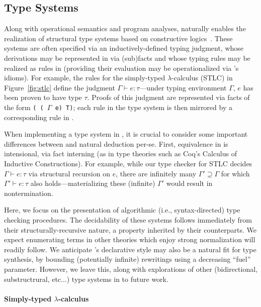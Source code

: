 \subsection{Type Systems}
\label{sec:apps:ts}

Along with operational semantics and program analyses, \slog{}
naturally enables the realization of structural type systems based on
constructive logics~\cite{tapl,atapl}.  These systems are often
specified via an inductively-defined typing judgment, whose
derivations may be represented in \slog{} via (sub)facts and whose
typing rules may be realized as rules in \slog{} (providing their
evaluation may be operationalized via \slog{}'s idioms). For example,
the rules for the simply-typed $\lambda$-calculus (STLC) in
Figure~\ref{fig:stlc} define the judgment $\Gamma \vdash e
:\tau$---under typing environment $\Gamma$, $e$ has been proven to
have type $\tau$. Proofs of this judgment are represented via \slog{}
facts of the form \texttt{(\rtag{:} ( $\Gamma$ e) T)}; each
rule in the type system is then mirrored by a corresponding rule in
\slog{}.

When implementing a type system in \slog{}, it is crucial to consider
some important differences between \slog{} and natural deduction
per-se. First, equivalence in \slog{} is intensional, via fact
interning (as in type theories such as Coq's Calculus of Inductive
Constructions). For example, while our type checker for STLC decides
$\Gamma \vdash e :\tau$ via structural recursion on $e$, there are
infinitely many $\Gamma' \supseteq \Gamma$ for which $\Gamma' \vdash e
:\tau$ also holds---materializing these (infinite) $\Gamma'$
would result in nontermination.

Here, we focus on the presentation of algorithmic (i.e.,
syntax-directed) type checking procedures. The decidability of these
systems follows immediately from their structurally-recursive nature,
a property inherited by their \slog{} counterparts. We expect
enumerating terms in other theories which enjoy strong normalization
will readily follow. We anticipate \slog{}'s declarative style may
also be a natural fit for type synthesis, by bounding (potentially
infinite) rewritings using a decreasing ``fuel'' parameter. However,
we leave this, along with explorations of other (bidirectional,
substructrural, etc...)  type systems in \slog{} to future work.

\paragraph*{Simply-typed $\lambda$-calculus}

